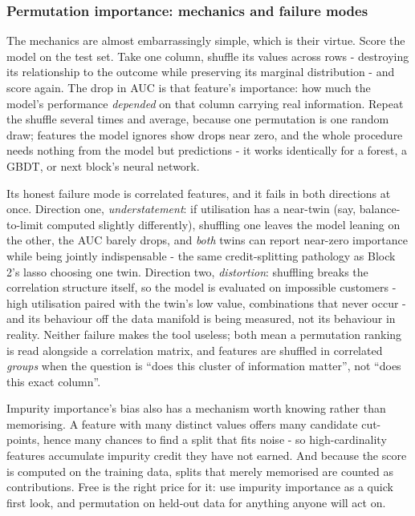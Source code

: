 \documentclass[11pt,a4paper]{article}
\begin{document}
\subsubsection{Permutation importance: mechanics and failure modes}
The mechanics are almost embarrassingly simple, which is their virtue.
Score the model on the test set. Take one column, shuffle its values
across rows - destroying its relationship to the outcome while
preserving its marginal distribution - and score again. The drop in
AUC is that feature's importance: how much the model's performance
\emph{depended} on that column carrying real information. Repeat the
shuffle several times and average, because one permutation is one
random draw; features the model ignores show drops near zero, and the
whole procedure needs nothing from the model but predictions - it
works identically for a forest, a GBDT, or next block's neural
network.

Its honest failure mode is correlated features, and it fails in both
directions at once. Direction one, \emph{understatement}: if
utilisation has a near-twin (say, balance-to-limit computed slightly
differently), shuffling one leaves the model leaning on the other, the
AUC barely drops, and \emph{both} twins can report near-zero
importance while being jointly indispensable - the same
credit-splitting pathology as Block 2's lasso choosing one twin.
Direction two, \emph{distortion}: shuffling breaks the correlation
structure itself, so the model is evaluated on impossible customers -
high utilisation paired with the twin's low value, combinations that
never occur - and its behaviour off the data manifold is being
measured, not its behaviour in reality. Neither failure makes the tool
useless; both mean a permutation ranking is read alongside a
correlation matrix, and features are shuffled in correlated
\emph{groups} when the question is ``does this cluster of information
matter'', not ``does this exact column''.

Impurity importance's bias also has a mechanism worth knowing rather
than memorising. A feature with many distinct values offers many
candidate cut-points, hence many chances to find a split that fits
noise - so high-cardinality features accumulate impurity credit they
have not earned. And because the score is computed on the training
data, splits that merely memorised are counted as contributions.
Free is the right price for it: use impurity importance as a quick
first look, and permutation on held-out data for anything anyone will
act on.
\end{document}
